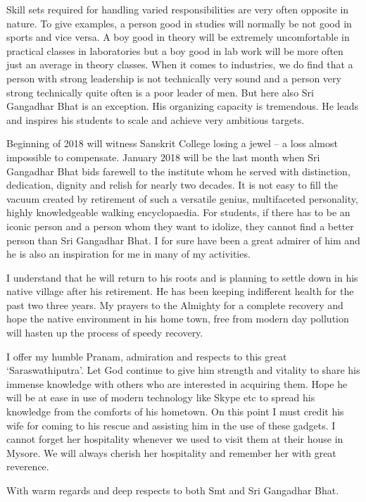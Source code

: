 Skill sets required for handling varied responsibilities are very often opposite in nature. To give examples, a person good in studies will normally be not good in sports and vice versa. A boy good in theory will be extremely uncomfortable in practical classes in laboratories but a boy good in lab work will be more often just an average in theory classes. When it comes to industries, we do find that a person with strong leadership is not technically very sound and a person very strong technically quite often is a poor leader of men. But here also Sri Gangadhar Bhat is an exception. His organizing capacity is tremendous. He leads and inspires his students to scale and achieve very ambitious targets.

Beginning of 2018 will witness Sanskrit College losing a jewel – a loss almost impossible to compensate. January 2018 will be the last month when Sri Gangadhar Bhat bids farewell to the institute whom he served with distinction, dedication, dignity and relish for nearly two decades. It is not easy to fill the vacuum created by retirement of such a versatile genius, multifaceted personality, highly knowledgeable walking encyclopaedia. For students, if there has to be an iconic person and a person whom they want to idolize, they cannot find a better person than Sri Gangadhar Bhat. I for sure have been a great admirer of him and he is also an inspiration for me in many of my activities.

I understand that he will return to his roots and is planning to settle down in his native village after his retirement. He has been keeping indifferent health for the past two three years. My prayers to the Almighty for a complete recovery and hope the native environment in his home town, free from modern day pollution will hasten up the process of speedy recovery.

I offer my humble Pranam, admiration and respects to this great ‘Saraswathiputra’. Let God continue to give him strength and vitality to share his immense knowledge with others who are interested in acquiring them. Hope he will be at ease in use of modern technology like Skype etc to spread his knowledge from the comforts of his hometown. On this point I must credit his wife for coming to his rescue and assisting him in the use of these gadgets. I cannot forget her hospitality whenever we used to visit them at their house in Mysore. We will always cherish her hospitality and remember her with great reverence.

With warm regards and deep respects to both Smt and Sri Gangadhar Bhat.

\articleend
